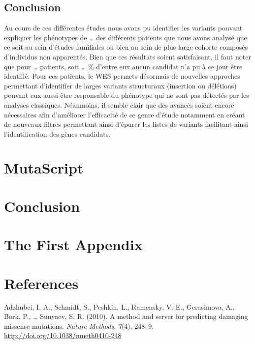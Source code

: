 \documentclass[12pt,twoside]{reedthesis}
\theoremstyle{definition}
\theoremstyle{definition}
\theoremstyle{remark}
\begin{document}
  \newpage 
  
  \section{Conclusion}\label{conclusion}
  
  Au cours de ces différentes études nous avons pu identifier les variants
  pouvant expliquer les phénotypes de \ldots{} des différents patients que
  nous avons analysé que ce soit au sein d'études familiales ou bien au
  sein de plus large cohorte composés d'individus non apparentés. Bien que
  ces résultats soient satisfaisant, il faut noter que pour \ldots{}
  patients, soit \ldots{} \% d'entre eux aucun candidat n'a pu à ce jour
  être identifié. Pour ces patients, le WES permets désormais de nouvelles
  approches permettant d'identifier de larges variants structuraux
  (insertion ou délétions) pouvant eux aussi être responsable du phénotype
  qui ne sont pas détectés par les analyses classiques. Néanmoins, il
  semble clair que des avancés soient encore nécessaires afin d'améliorer
  l'efficacité de ce genre d'étude notamment en créant de nouveaux filtres
  permettant ainsi d'épurer les listes de variants facilitant ainsi
  l'identification des gènes candidats.
  
  \chapter{MutaScript}\label{mutascript}
  
  \chapter*{Conclusion}\label{conclusion-1}
  
  \chapter{The First Appendix}\label{the-first-appendix}
  
  \chapter*{References}\label{references}
  
  \hypertarget{refs}{}
  \hypertarget{ref-Adzhubei2010}{}
  Adzhubei, I. A., Schmidt, S., Peshkin, L., Ramensky, V. E., Gerasimova,
  A., Bork, P., \ldots{} Sunyaev, S. R. (2010). A method and server for
  predicting damaging missense mutations. \emph{Nature Methods},
  \emph{7}(4), 248--9. \url{http://doi.org/10.1038/nmeth0410-248}
  
\end{document}
